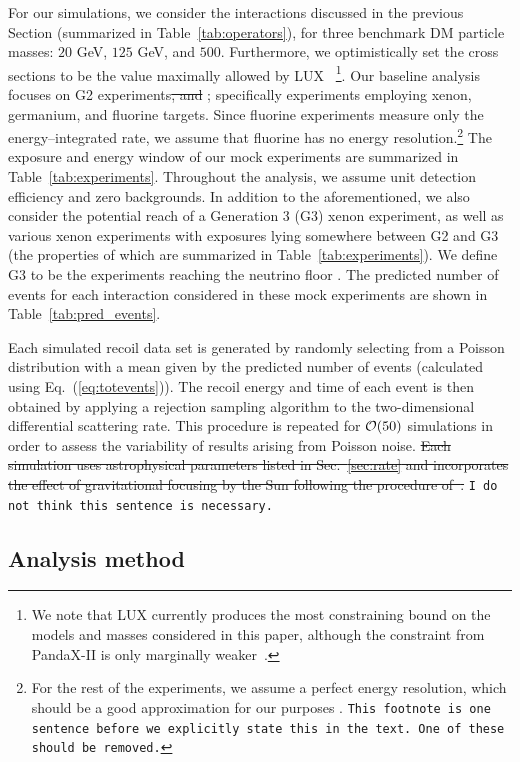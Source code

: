 \documentclass[11pt]{article}
\newcommand{\Eq}[1]{Eq.~(\ref{#1})} \newcommand{\Eqs}[2]{Eqs.~(\ref{#1}) and (\ref{#2})} \newcommand{\Eqm}[2]{Eqs.~(\ref{#1}) through (\ref{#2})}
\newcommand{\Sec}[1]{Sec.~\ref{#1}} \newcommand{\Secs}[2]{Secs.~\ref{#1} and \ref{#2}} \newcommand{\Secm}[2]{Secs.~\ref{#1} through \ref{#2}}
\newcommand{\sjwColor}{red}
\newcommand{\sjw}[1]{{\color{\sjwColor} #1}}
\newcommand{\sjwrm}[1]{{\color{\sjwColor}\protect\sout{#1}}}
\newcommand{\sjwtt}[1]{{\color{\sjwColor}\tt #1}}
\begin{document}
For our simulations, we consider the interactions discussed in the previous Section (summarized in Table~\ref{tab:operators}), for three benchmark DM particle masses: $20$ GeV, $125$ GeV, and $500$. Furthermore, we optimistically set the cross sections to be the value maximally allowed by LUX~\cite{Akerib:2016vxi} \footnote{We note that LUX currently produces the most constraining bound on the models and masses considered in this paper, although the constraint from PandaX-II is only marginally weaker~\cite{Tan:2016zwf}.}. Our baseline analysis focuses on G2 experiments\sjwrm{, and}\sjw{;} specifically experiments employing xenon, germanium, and fluorine targets. Since fluorine experiments measure only the energy--integrated rate, we assume that fluorine has no energy resolution.\footnote{For the rest of the experiments, we assume a perfect energy resolution, which should be a good approximation for our purposes \cite{Gluscevic:2015sqa}. \sjwtt{This footnote is one sentence before we explicitly state this in the text. One of these should be removed.}}  The exposure and energy window of our mock experiments are summarized in Table~\ref{tab:experiments}. Throughout the analysis, we assume unit detection efficiency and zero backgrounds. In addition to the aforementioned, we also consider the potential reach of a Generation 3 (G3) xenon experiment, as well as various xenon experiments with exposures lying somewhere between G2 and G3 (the properties of which are summarized in Table~\ref{tab:experiments}).  We define G3 to be the experiments reaching the neutrino floor \cite{Billard:2013qya}. The predicted number of events for each interaction considered in these mock experiments are shown in Table~\ref{tab:pred_events}. 

Each simulated recoil data set is generated by randomly selecting from a Poisson distribution with a mean given by the predicted number of events (calculated using \Eq{eq:totevents}). The recoil energy and time of each event is then obtained by applying a rejection sampling algorithm to the two-dimensional differential scattering rate. This procedure is repeated for ${\cal O}(50)$ simulations in order to assess the variability of results arising from Poisson noise. \sjwrm{Each simulation uses astrophysical parameters listed in \Sec{sec:rate} and incorporates the effect of gravitational focusing by the Sun following the procedure of~\cite{Lee:2013wza}.} \sjwtt{I do not think this sentence is necessary.}

\subsection{Analysis method}\label{sec:stats}
\end{document}

